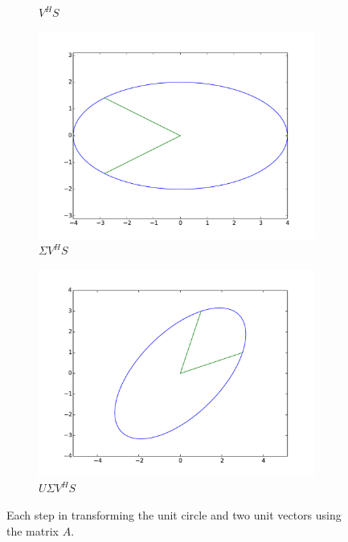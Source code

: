 \begin{figure}
\begin{subfigure}[b]{.49\textwidth}
  \caption{$V^HS$}
\end{subfigure}
\begin{subfigure}[b]{.49\textwidth}
  \centering
  \includegraphics[width=\textwidth]{svcircle.pdf}
  \caption{$\Sigma V^H S$}
\end{subfigure}
\begin{subfigure}[b]{.49\textwidth}
  \centering
  \includegraphics[width=\textwidth]{full_transformation.pdf}
  \caption{$U \Sigma V^H S$}
\end{subfigure}
\caption{Each step in transforming the unit circle and two unit vectors using the matrix $A$.}
\label{fig:sol1}
\end{figure}

